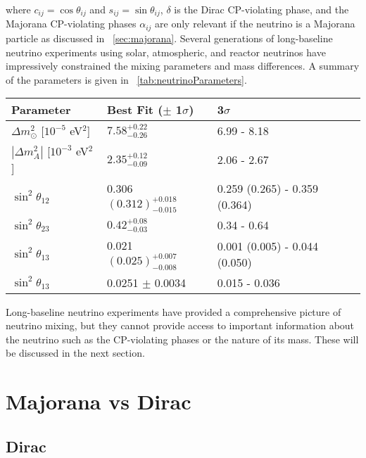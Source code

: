 where $c_{ij} = \cos{\theta_{ij}}$ and $s_{ij} = \sin{\theta_{ij}}$, $\delta$ is the Dirac CP-violating phase, and the Majorana CP-violating phases $\alpha_{ij}$ are only relevant if the neutrino is a Majorana particle as discussed in {\sect}~\ref{sec:majorana}.  Several generations of long-baseline neutrino experiments using solar, atmospheric, and reactor neutrinos have impressively constrained the mixing parameters and mass differences.  A summary of the parameters is given in {\tab}~\ref{tab:neutrinoParameters}.
\begin{table*}
\centering
\begin{tabular}{lll}\toprule
Parameter & Best Fit ($\pm$ 1$\sigma$) & 3$\sigma$ \\
\midrule
${\Delta}m^2_{\odot}$ [$10^{-5}$ eV$^2$] & $7.58^{+0.22}_{-0.26}$ & 6.99 - 8.18 \\
$|{\Delta}m^2_A|$ [$10^{-3}$ eV$^2$] & $2.35^{+0.12}_{-0.09}$ & 2.06 - 2.67 \\
$\sin^2{\theta_{12}}$ & 0.306 $(0.312)^{+0.018}_{-0.015}$ & 0.259 (0.265) - 0.359 (0.364) \\  
$\sin^2{\theta_{23}}$ & $0.42^{+0.08}_{-0.03}$ & 0.34 - 0.64 \\  
$\sin^2{\theta_{13}}$ & 0.021 $(0.025)^{+0.007}_{-0.008}$ & 0.001 (0.005) - 0.044 (0.050) \\   
$\sin^2{\theta_{13}}$ & 0.0251 $\pm$ 0.0034 & 0.015 - 0.036 \\
\bottomrule  
\end{tabular}
\caption{From PDG.}
\label{tab:neutrinoParameters}
\end{table*}
Long-baseline neutrino experiments have provided a comprehensive picture of neutrino mixing, but they cannot provide access to important information about the neutrino such as the CP-violating phases or the nature of its mass.  These will be discussed in the next section.


\section{Majorana vs Dirac}
\label{sec:mVd}
\begin{comment}
Discuss mechanisms by which neutrinos could get their mass.  
\end{comment}

\subsection{Dirac}
\begin{comment}
Discuss Dirac mechanism for mass
\end{comment}

